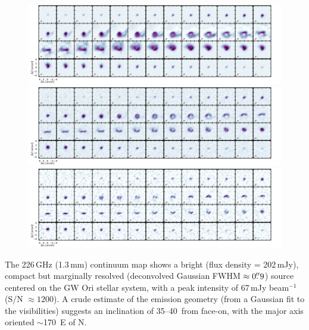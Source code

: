 \documentclass[twocolumn]{aastex61}
\begin{document}
\begin{figure}[ht!]
\begin{center}
  \includegraphics[width=\linewidth]{chanmaps_12co.pdf}
  \includegraphics[width=\linewidth]{chanmaps_13co.pdf}
  \includegraphics[width=\linewidth]{chanmaps_c18o.pdf}
  \end{center}
\end{figure}

The 226\,GHz (1.3\,mm) continuum map shows a bright (flux density = 202\,mJy), compact but marginally resolved (deconvolved Gaussian FWHM $\approx 0\mbox{$.\!\!^{\prime\prime}$}9$) source centered on the GW Ori stellar system, with a peak intensity of 67\,mJy beam$^{-1}$ (S/N $\approx 1200$).  A crude estimate of the emission geometry (from a Gaussian fit to the visibilities) suggests an inclination of 35--40\degr\ from face-on, with the major axis oriented $\sim$170\degr\ E of N.
\end{document}
